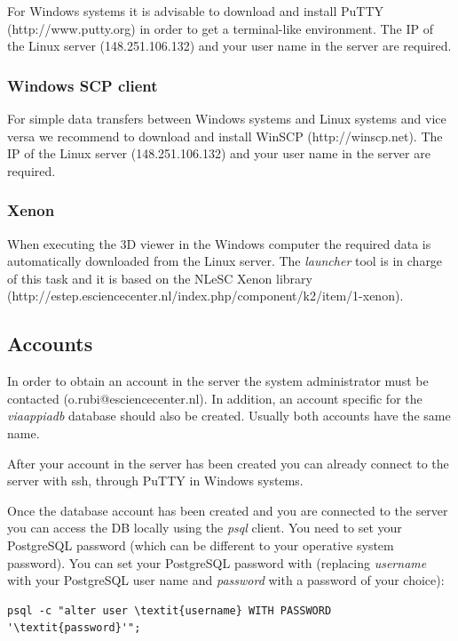 \documentclass[a4paper,11pt]{article}
\begin{document}
For Windows systems it is advisable to download and install PuTTY (http://www.putty.org) in order to get a terminal-like environment. The IP of the Linux server (148.251.106.132) and your user name in the server are required.

\subsubsection{Windows SCP client}
\label{sec:winscp}

For simple data transfers between Windows systems and Linux systems and vice versa we recommend to download and install WinSCP (http://winscp.net). The IP of the Linux server (148.251.106.132) and your user name in the server are required.

\subsubsection{Xenon}

When executing the 3D viewer in the Windows computer the required data is automatically downloaded from the Linux server. The \textit{launcher} tool is in charge of this task and it is based on the NLeSC Xenon library (http://estep.esciencecenter.nl/index.php/component/k2/item/1-xenon).

\subsection{Accounts}
\label{sec:accounts}

In order to obtain an account in the server the system administrator must be contacted (o.rubi@esciencecenter.nl). In addition, an account specific for the \textit{viaappiadb} database should also be created. Usually both accounts have the same name.

After your account in the server has been created you can already connect to the server with ssh, through PuTTY in Windows systems. 

Once the database account has been created and you are connected to the server you can access the DB locally using the \textit{psql} client. You need to set your PostgreSQL password (which can be different to your operative system password). You can set your PostgreSQL password with (replacing \textit{username} with your PostgreSQL user name and \textit{password} with a password of your choice):

\begin{Verbatim}[fontfamily=courier,commandchars=\\\{\},fontsize=\footnotesize]
psql -c "alter user \textit{username} WITH PASSWORD '\textit{password}'";
\end{Verbatim}
\end{document}
